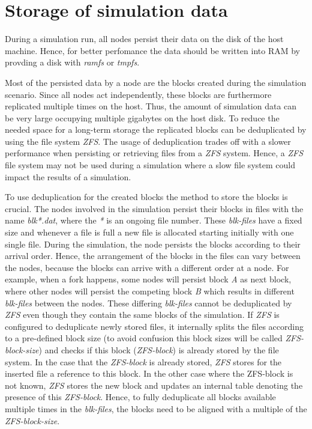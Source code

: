 \section{Storage of simulation data}

During a simulation run, all nodes persist their data on the disk of the host machine.
Hence, for better perfomance the data should be written into RAM by provding a disk with \textit{ramfs} or \textit{tmpfs}.

Most of the persisted data by a node are the blocks created during the simulation scenario.
Since all nodes act independently, these blocks are furthermore replicated multiple times on the host.
Thus, the amount of simulation data can be very large occupying multiple gigabytes on the host disk.
To reduce the needed space for a long-term storage the replicated blocks can be deduplicated by using the file system \textit{ZFS}.
The usage of deduplication trades off with a slower performance when persisting or retrieving files from a \textit{ZFS} system.
Hence, a \textit{ZFS} file system may not be used during a simulation where a slow file system could impact the results of a simulation.

To use deduplication for the created blocks the method to store the blocks is crucial.
The nodes involved in the simulation persist their blocks in files with the name \textit{blk*.dat}, where the \textit{*} is an ongoing file number.
These \textit{blk-files} have a fixed size and whenever a file is full a new file is allocated starting initially with one single file.
During the simulation, the node persists the blocks according to their arrival order.
Hence, the arrangement of the blocks in the files can vary between the nodes, because the blocks can arrive with a different order at a node.
For example, when a fork happens, some nodes will persist block \textit{A} as next block, where other nodes will persist the competing block \textit{B} which results in different \textit{blk-files} between the nodes.
These differing \textit{blk-files} cannot be deduplicated by \textit{ZFS} even though they contain the same blocks of the simulation.
If \textit{ZFS} is configured to deduplicate newly stored files, it internally splits the files according to a pre-defined block size (to avoid confusion this block sizes will be called \textit{ZFS-block-size}) and checks if this block (\textit{ZFS-block}) is already stored by the file system.
In the case that the \textit{ZFS-block} is already stored, \textit{ZFS} stores for the inserted file a reference to this block.
In the other case where the ZFS-block is not known, \textit{ZFS} stores the new block and updates an internal table denoting the presence of this \textit{ZFS-block}.
Hence, to fully deduplicate all blocks available multiple times in the \textit{blk-files}, the blocks need to be aligned with a multiple of the \textit{ZFS-block-size}.

